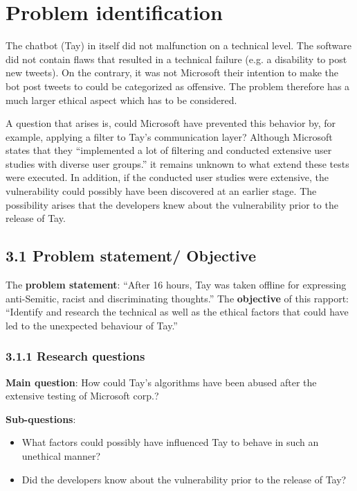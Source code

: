 \chapter{Problem identification}
The chatbot (Tay) in itself did not malfunction on a technical level. The software did not contain flaws that resulted in a technical failure (e.g. a disability to post new tweets). On the contrary, it was not Microsoft their intention to make the bot post tweets to could be categorized as offensive. The problem therefore has a much larger ethical aspect which has to be considered.

A question that arises is, could Microsoft have prevented this behavior by, for example, applying a filter to Tay’s communication layer? Although Microsoft states that they “implemented a lot of filtering and conducted extensive user studies with diverse user groups.”\cite{statementpeterlee} it remains unknown to what extend these tests were executed. In addition, if the conducted user studies were extensive, the vulnerability could possibly have been discovered at an earlier stage. The possibility arises that the developers knew about the vulnerability prior to the release of Tay.

\section*{\textbf{3.1 Problem statement/ Objective}}
The \textbf{problem statement}: “After 16 hours, Tay was taken offline for expressing anti-Semitic, racist and discriminating thoughts.”
The \textbf{objective} of this rapport: “Identify and research the technical as well as the ethical factors that could have led to the unexpected behaviour of Tay.”

\subsection*{3.1.1 Research questions}
\textbf{Main question}: How could Tay’s algorithms have been abused after the extensive testing of Microsoft corp.?

\textbf{Sub-questions}:
\begin{itemize}
	\item What factors could possibly have influenced Tay to behave in such an unethical manner?
	\item Did the developers know about the vulnerability prior to the release of Tay?
\end{itemize}